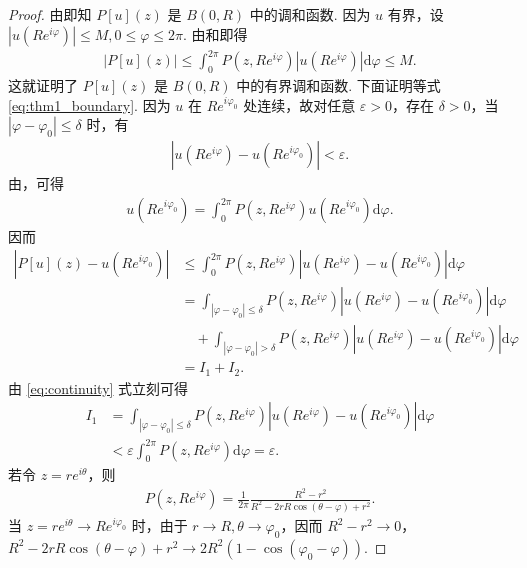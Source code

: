 \documentclass[../../main.tex]{subfiles}%
\begin{document}
\begin{proof}
由即知 \(P[u](z)\) 是 \(B(0,R)\) 中的调和函数. 因为 \(u\) 有界，设 \(|u(Re^{i\varphi})|\leqslant M, 0\leqslant \varphi \leqslant 2\pi.\) 由和即得
\begin{align*}
|P[u](z)| \leqslant \int_{0}^{2\pi} P(z, Re^{i\varphi}) |u(Re^{i\varphi})| \mathrm{d}\varphi \leqslant M.
\end{align*}
这就证明了 \(P[u](z)\) 是 \(B(0,R)\) 中的有界调和函数.
下面证明等式 \eqref{eq:thm1_boundary}. 因为 \(u\) 在 \(Re^{i\varphi_0}\) 处连续，故对任意 \(\varepsilon>0\)，存在 \(\delta>0\)，当 \(|\varphi-\varphi_0|\leqslant \delta\) 时，有
\begin{align}
|u(Re^{i\varphi}) - u(Re^{i\varphi_0})| < \varepsilon. \label{eq:continuity}
\end{align}
由，可得
\begin{align*}
u(Re^{i\varphi_0}) = \int_{0}^{2\pi} P(z, Re^{i\varphi}) u(Re^{i\varphi_0}) \mathrm{d}\varphi.
\end{align*}
因而
\begin{align*}
|P[u](z) - u(Re^{i\varphi_0})| &\leqslant \int_{0}^{2\pi} P(z, Re^{i\varphi}) |u(Re^{i\varphi}) - u(Re^{i\varphi_0})| \mathrm{d}\varphi \\
&= \int_{|\varphi-\varphi_0|\leqslant \delta} P(z, Re^{i\varphi}) |u(Re^{i\varphi}) - u(Re^{i\varphi_0})| \mathrm{d}\varphi \\
&\quad + \int_{|\varphi-\varphi_0|>\delta} P(z, Re^{i\varphi}) |u(Re^{i\varphi}) - u(Re^{i\varphi_0})| \mathrm{d}\varphi \\
&= I_1 + I_2.
\end{align*}
由 \eqref{eq:continuity} 式立刻可得
\begin{align*}
I_1 &= \int_{|\varphi-\varphi_0|\leqslant \delta} P(z, Re^{i\varphi}) |u(Re^{i\varphi}) - u(Re^{i\varphi_0})| \mathrm{d}\varphi \\
&< \varepsilon \int_{0}^{2\pi} P(z, Re^{i\varphi}) \mathrm{d}\varphi = \varepsilon.
\end{align*}
若令 \(z=re^{i\theta}\)，则
\begin{align*}
P(z, Re^{i\varphi}) = \frac{1}{2\pi} \frac{R^2 - r^2}{R^2 - 2rR\cos(\theta-\varphi) + r^2}.
\end{align*}
当 \(z=re^{i\theta} \to Re^{i\varphi_0}\) 时，由于 \(r \to R, \theta \to \varphi_0\)，因而 \(R^2 - r^2 \to 0\)，\(R^2 - 2rR\cos(\theta-\varphi) + r^2 \to 2R^2(1 - \cos(\varphi_0-\varphi))\).

\end{proof}
\end{document}
